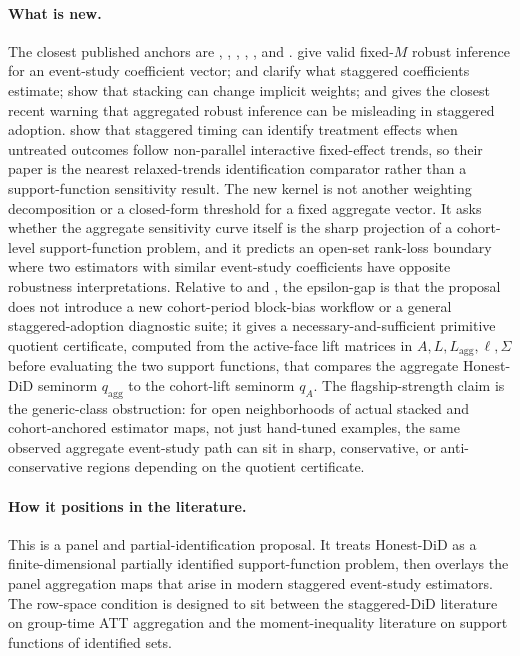 \documentclass[11pt]{article}
\theoremstyle{definition}
\theoremstyle{plain}
\theoremstyle{remark}
\begin{document}
\paragraph{What is new.}
The closest published anchors are \citet{rambachan2023parallel}, \citet{callaway2021multiple}, \citet{callaway2023nonparallel}, \citet{sunabraham2021eventstudy}, \citet{wing2024stacked}, and \citet{liu2025cohortanchored}.
\citet{rambachan2023parallel} give valid fixed-\(M\) robust inference for an event-study coefficient vector; \citet{callaway2021multiple} and \citet{sunabraham2021eventstudy} clarify what staggered coefficients estimate; \citet{wing2024stacked} show that stacking can change implicit weights; and \citet{liu2025cohortanchored} gives the closest recent warning that aggregated robust inference can be misleading in staggered adoption.
\citet{callaway2023nonparallel} show that staggered timing can identify treatment effects when untreated outcomes follow non-parallel interactive fixed-effect trends, so their paper is the nearest relaxed-trends identification comparator rather than a support-function sensitivity result.
The new kernel is not another weighting decomposition or a closed-form threshold for a fixed aggregate vector.
It asks whether the aggregate sensitivity curve itself is the sharp projection of a cohort-level support-function problem, and it predicts an open-set rank-loss boundary where two estimators with similar event-study coefficients have opposite robustness interpretations.
Relative to \citet{liu2025cohortanchored} and \citet{wright2026designrobust}, the epsilon-gap is that the proposal does not introduce a new cohort-period block-bias workflow or a general staggered-adoption diagnostic suite; it gives a necessary-and-sufficient primitive quotient certificate, computed from the active-face lift matrices in \(A,L,L_{\mathrm{agg}},\ell,\Sigma\) before evaluating the two support functions, that compares the aggregate Honest-DiD seminorm \(q_{\mathrm{agg}}\) to the cohort-lift seminorm \(q_A\).
The flagship-strength claim is the generic-class obstruction: for open neighborhoods of actual stacked and cohort-anchored estimator maps, not just hand-tuned examples, the same observed aggregate event-study path can sit in sharp, conservative, or anti-conservative regions depending on the quotient certificate.

\paragraph{How it positions in the literature.}
This is a panel and partial-identification proposal.
It treats Honest-DiD as a finite-dimensional partially identified support-function problem, then overlays the panel aggregation maps that arise in modern staggered event-study estimators.
The row-space condition is designed to sit between the staggered-DiD literature on group-time ATT aggregation and the moment-inequality literature on support functions of identified sets.
\end{document}
